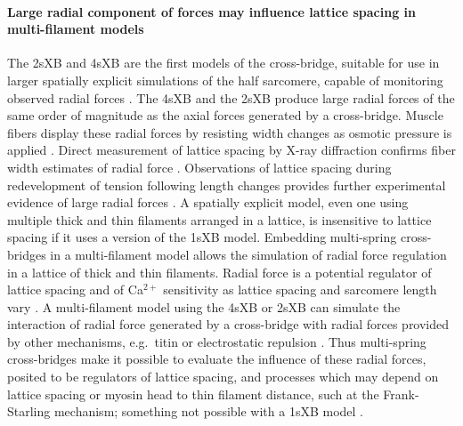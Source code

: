 \documentclass[11pt,titlepage]{article}
\begin{document}
\paragraph{Large radial component of forces may influence lattice spacing in multi-filament models} %
The 2sXB and 4sXB are the first models of the cross-bridge, suitable for use in larger spatially explicit simulations of the half sarcomere, capable of monitoring observed radial forces \citep{Maughan1981, Cecchi1990, Millman1998}. 
The 4sXB and the 2sXB produce large radial forces of the same order of magnitude as the axial forces generated by a cross-bridge. 
Muscle fibers display these radial forces by resisting width changes as osmotic pressure is applied \citep{Maughan1981}.
Direct measurement of lattice spacing by X-ray diffraction confirms fiber width estimates of radial force \citep{Matsubara1984}.
Observations of lattice spacing during redevelopment of tension following length changes provides further experimental evidence of large radial forces \citep{Cecchi1990}. %
A spatially explicit model, even one using multiple thick and thin filaments arranged in a lattice, is insensitive to lattice spacing if it uses a version of the 1sXB model.  
Embedding multi-spring cross-bridges in a multi-filament model allows the simulation of radial force regulation in a lattice of thick and thin filaments.  
Radial force is a potential regulator of lattice spacing and of Ca$^{2+}$ sensitivity as lattice spacing and sarcomere length vary \citep{Millman1998}.  
A multi-filament model using the 4sXB or 2sXB can simulate the interaction of radial force generated by a cross-bridge with radial forces provided by other mechanisms, e.g.\ titin or electrostatic repulsion \citep{Martyn2004, Cazorla2001, Millman1998}. 
Thus multi-spring cross-bridges make it possible to evaluate the influence of these radial forces, posited to be regulators of lattice spacing, and processes which may depend on lattice spacing or myosin head to thin filament distance, such at the Frank-Starling mechanism; something not possible with a 1sXB model \citep{Smith2009}. 

\end{document}
